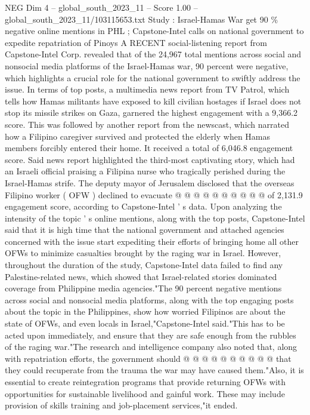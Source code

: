 \begin{textsample}{NEG Dim 4 – global\_south\_2023\_11 – Score 1.00 – global\_south\_2023\_11/103115653.txt}  \label{ex:f4_neg_305}
Study : Israel-Hamas War get 90 \% negative online mentions in PHL ; Capstone-Intel calls on national government to expedite repatriation of Pinoys A RECENT social-listening report from Capstone-Intel Corp. revealed that of the 24,967 total mentions across social and nonsocial media platforms of the Israel-Hamas war, 90 percent were negative, which highlights a crucial role for the national government to swiftly address the issue.
In terms of top posts, a multimedia news report from TV Patrol, which tells how Hamas militants have exposed to kill civilian hostages if Israel does not stop its missile strikes on Gaza, garnered the highest engagement with a 9,366.2 score.
This was followed by another report from the newscast, which narrated how a Filipino caregiver survived and protected the elderly when Hamas members forcibly entered their home.
It received a total of 6,046.8 engagement score.
Said news report highlighted the third-most captivating story, which had an Israeli official praising a Filipina nurse who tragically perished during the Israel-Hamas strife.
The deputy mayor of Jerusalem disclosed that the overseas Filipino worker ( OFW ) declined to evacuate @ @ @ @ @ @ @ @ @ @ of 2,131.9 engagement score, according to Capstone-Intel ' s data.
Upon analyzing the intensity of the topic ' s online mentions, along with the top posts, Capstone-Intel said that it is high time that the national government and attached agencies concerned with the issue start expediting their efforts of bringing home all other OFWs to minimize casualties brought by the raging war in Israel.
However, throughout the duration of the study, Capstone-Intel data failed to find any Palestine-related news, which showed that Israel-related stories dominated coverage from Philippine media agencies."The 90 percent negative mentions across social and nonsocial media platforms, along with the top engaging posts about the topic in the Philippines, show how worried Filipinos are about the state of OFWs, and even locals in Israel,"Capstone-Intel said."This has to be acted upon immediately, and ensure that they are safe enough from the rubbles of the raging war."The research and intelligence company also noted that, along with repatriation efforts, the government should @ @ @ @ @ @ @ @ @ @ that they could recuperate from the trauma the war may have caused them."Also, it is essential to create reintegration programs that provide returning OFWs with opportunities for sustainable livelihood and gainful work.
These may include provision of skills training and job-placement services,"it ended.

\end{textsample}
